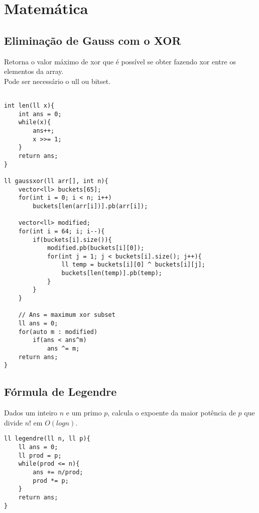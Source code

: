 \chapter{Matemática}


\section{Eliminação de Gauss com o XOR}

Retorna o valor máximo de xor que é possível se obter fazendo xor entre os elementos da array. \\	
Pode ser necessário o ull ou bitset.
\begin{multicols}{2}
	\begin{lstlisting}

int len(ll x){
	int ans = 0;
	while(x){
		ans++;
		x >>= 1;
	}
	return ans;
}
	
ll gaussxor(ll arr[], int n){
	vector<ll> buckets[65];
	for(int i = 0; i < n; i++)
		buckets[len(arr[i])].pb(arr[i]);
	
	vector<ll> modified;
	for(int i = 64; i; i--){
		if(buckets[i].size()){
			modified.pb(buckets[i][0]);
			for(int j = 1; j < buckets[i].size(); j++){
				ll temp = buckets[i][0] ^ buckets[i][j];
				buckets[len(temp)].pb(temp);
			}
		}
	}
	
	// Ans = maximum xor subset
	ll ans = 0;
	for(auto m : modified)
		if(ans < ans^m)
			ans ^= m;
	return ans;
}
	\end{lstlisting}
\end{multicols}
\section{Fórmula de Legendre}

Dados um inteiro $n$ e um primo $p$, calcula o expoente da maior potência de $p$ que divide $n!$ em $O(logn)$.
\begin{multicols}{2}
	\begin{lstlisting}
ll legendre(ll n, ll p){
	ll ans = 0;
	ll prod = p;
	while(prod <= n){
		ans += n/prod;
		prod *= p;
	}
	return ans;
}
	\end{lstlisting}
\end{multicols}
